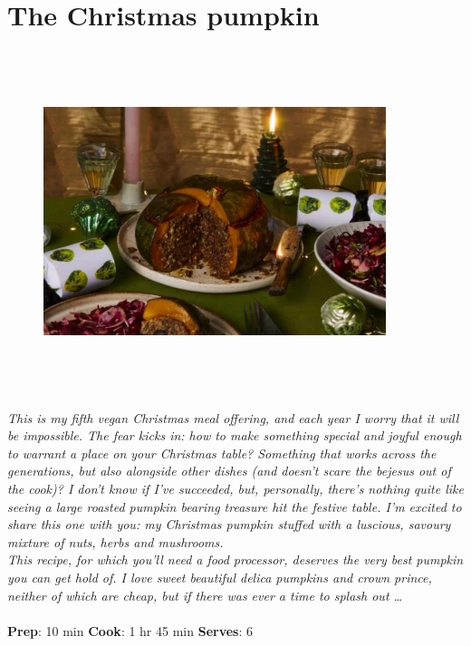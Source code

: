 \documentclass{book}
\begin{document}
\section{The Christmas pumpkin}
\begin{figure}
\centering\includegraphics[width=10cm,height=10cm,keepaspectratio]{Recipe_Pictures/The_Christmas_pumpkin.png}
\end{figure}
\emph{This is my fifth vegan Christmas meal offering, and each year I worry that it will be impossible. The fear kicks in: how to make something special and joyful enough to warrant a place on your Christmas table? Something that works across the generations, but also alongside other dishes (and doesn’t scare the bejesus out of the cook)? I don’t know if I’ve succeeded, but, personally, there’s nothing quite like seeing a large roasted pumpkin bearing treasure hit the festive table. I’m excited to share this one with you: my Christmas pumpkin stuffed with a luscious, savoury mixture of nuts, herbs and mushrooms.\\ 
This recipe, for which you’ll need a food processor, deserves the very best pumpkin you can get hold of. I love sweet beautiful delica pumpkins and crown prince, neither of which are cheap, but if there was ever a time to splash out …}\\\\ 
\textbf{Prep}: 10 min
\textbf{Cook}: 1 hr 45 min
\textbf{Serves}: 6
\end{document}
